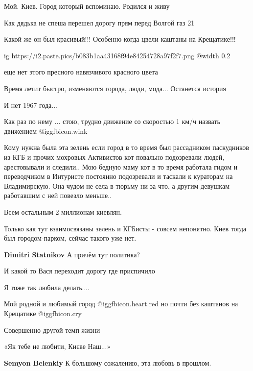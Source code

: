 \begin{itemize}
Мой. Киев. Город который вспоминаю. Родился и живу

Как дядька не спеша перешел дорогу прям перед Волгой газ 21

Какой же он был красивый!!! Особенно когда цвели каштаны на Крещатике!!!

\ifcmt
  ig https://i2.paste.pics/b083b1aa43168f94e84254728a97f2f7.png
  @width 0.2
\fi

еще нет этого пресного навязчивого красного цвета

Время летит быстро, изменяются города, люди, мода... Останется история

И нет 1967 года...

Как раз по нему ... стою, трудно движение со скоростью 1 км/ч назвать движением  @igg{fbicon.wink} 


Кому нужна была эта зелень если город в то время был рассадником паскудников из
КГБ и прочих мохровых Активистов кот повально подозревали людей, арестовывали и
следили.. Мою бедную маму кот в то время работала гидом и переводчиком в
Интуристе постоянно подозревали и таскали к кураторам на Владимирскую. Она
чудом не села в тюрьму ни за что, а другим девушкам работавшим с ней повезло
меньше..

\begin{itemize} %
Всем остальным 2 миллионам киевлян.

Только как тут взаимосвязаны зелень и КГБисты - совсем непонятно.
Киев тогда был городом-парком, сейчас такого уже нет.

\textbf{Dimitri Statnikov} А причём тут политика?
\end{itemize} %

И какой то Вася переходит дорогу где приспичило

Я тоже так любила делать....

Мой родной и любимый город @igg{fbicon.heart.red} но почти без каштанов на Крещатике  @igg{fbicon.cry} 

Совершенно другой темп жизни

«Як тебе не любити,
Києве Наш...»

\begin{itemize} %
\textbf{Semyon Belenkiy} К большому сожалению, эта любовь в прошлом.


\end{itemize}
\end{itemize}

